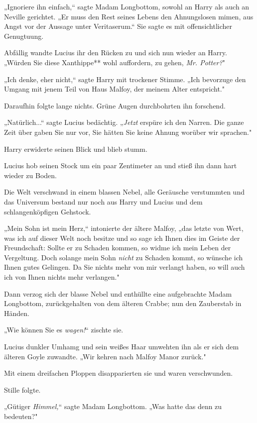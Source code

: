 {„Ignoriere ihn einfach,“ sagte Madam Longbottom, sowohl an Harry als auch an Neville gerichtet. „Er muss den Rest seines Lebens den Ahnungslosen mimen, aus Angst vor der Aussage unter Veritaserum.“ Sie sagte es mit offensichtlicher Genugtuung.

Abfällig wandte Lucius ihr den Rücken zu und sich nun wieder an Harry. „Würden Sie diese Xanthippe** wohl auffordern, zu gehen, \emph{Mr. Potter?}"

„Ich denke, eher nicht,“ sagte Harry mit trockener Stimme. „Ich bevorzuge den Umgang mit jenem Teil von Haus Malfoy, der meinem Alter entspricht."

Daraufhin folgte lange nichts. Grüne Augen durchbohrten ihn forschend.

„Natürlich...“ sagte Lucius bedächtig. „\emph{Jetzt} erspüre ich den Narren. Die ganze Zeit über gaben Sie nur vor, Sie hätten Sie keine Ahnung worüber wir sprachen."

Harry erwiderte seinen Blick und blieb stumm.

Lucius hob seinen Stock um ein paar Zentimeter an und stieß ihn dann hart wieder zu Boden.

Die Welt verschwand in einem blassen Nebel, alle Geräusche verstummten und das Universum bestand nur noch aus Harry und Lucius und dem schlangenköpfigen Gehstock.

„Mein Sohn ist mein Herz,“ intonierte der ältere Malfoy, „das letzte von Wert, was ich auf dieser Welt noch besitze und so sage ich Ihnen dies im Geiste der Freundschaft: Sollte er zu Schaden kommen, so widme ich mein Leben der Vergeltung. Doch solange mein Sohn \emph{nicht} zu Schaden kommt, so wünsche ich Ihnen gutes Gelingen. Da Sie nichts mehr von mir verlangt haben, so will auch ich von Ihnen nichts mehr verlangen."

Dann verzog sich der blasse Nebel und enthüllte eine aufgebrachte Madam Longbottom, zurückgehalten von dem älteren Crabbe; nun den Zauberstab in Händen.

„Wie können Sie es \emph{wagen!}“ zischte sie.

Lucius dunkler Umhamg und sein weißes Haar umwehten ihn als er sich dem älteren Goyle zuwandte. „Wir kehren nach Malfoy Manor zurück."

Mit einem dreifachen Ploppen disapparierten sie und waren verschwunden.

Stille folgte.

„Gütiger \emph{Himmel,}“ sagte Madam Longbottom. „Was hatte das denn zu bedeuten?"

}
